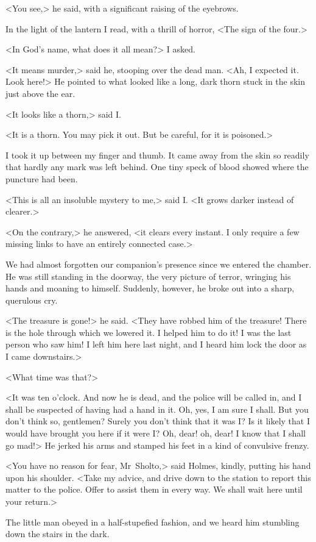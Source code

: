 <You see,> he said, with a significant raising of the eyebrows.

In the light of the lantern I read, with a thrill of horror, <The sign of the four.>

<In God's name, what does it all mean?> I asked.

<It means murder,> said he, stooping over the dead man. <Ah, I expected it. Look here!> He pointed to what looked like a long, dark thorn stuck in the skin just above the ear.

<It looks like a thorn,> said I\@.

<It is a thorn. You may pick it out. But be careful, for it is poisoned.>

I took it up between my finger and thumb. It came away from the skin so readily that hardly any mark was left behind. One tiny speck of blood showed where the puncture had been.

<This is all an insoluble mystery to me,> said I\@. <It grows darker instead of clearer.>

<On the contrary,> he answered, <it clears every instant. I only require a few missing links to have an entirely connected case.>

We had almost forgotten our companion's presence since we entered the chamber. He was still standing in the doorway, the very picture of terror, wringing his hands and moaning to himself. Suddenly, however, he broke out into a sharp, querulous cry.

<The treasure is gone!> he said. <They have robbed him of the treasure! There is the hole through which we lowered it. I helped him to do it! I was the last person who saw him! I left him here last night, and I heard him lock the door as I came downstairs.>

<What time was that?>

<It was ten o'clock. And now he is dead, and the police will be called in, and I shall be suspected of having had a hand in it. Oh, yes, I am sure I shall. But you don't think so, gentlemen? Surely you don't think that it was I\@? Is it likely that I would have brought you here if it were I\@? Oh, dear! oh, dear! I know that I shall go mad!> He jerked his arms and stamped his feet in a kind of convulsive frenzy.

<You have no reason for fear, Mr~Sholto,> said Holmes, kindly, putting his hand upon his shoulder. <Take my advice, and drive down to the station to report this matter to the police. Offer to assist them in every way. We shall wait here until your return.>

The little man obeyed in a half-stupefied fashion, and we heard him stumbling down the stairs in the dark.